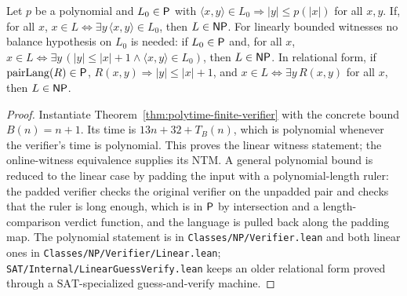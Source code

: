 \begin{lemma}
  \label{lem:polytime-guess-verify}
  \leanok
  Let $p$ be a polynomial and $L_0 \in \mathsf{P}$ with
  $\langle x, y \rangle \in L_0 \Rightarrow |y| \le p(|x|)$ for all $x, y$.
  If, for all $x$, $x \in L \iff \exists y\, \langle x, y \rangle \in L_0$,
  then $L \in \mathsf{NP}$. For linearly bounded witnesses no balance hypothesis
  on $L_0$ is needed: if $L_0 \in \mathsf{P}$ and, for all $x$,
  $x \in L \iff \exists y\, (|y| \le |x| + 1 \wedge \langle x, y \rangle \in
  L_0)$, then $L \in \mathsf{NP}$. In relational form, if
  $\mathrm{pairLang}(R) \in \mathsf{P}$, $R(x, y) \Rightarrow |y| \le |x| + 1$,
  and $x \in L \iff \exists y\, R(x, y)$ for all $x$, then $L \in \mathsf{NP}$.
\end{lemma}
\begin{proof}
  \leanok
  Instantiate Theorem~\ref{thm:polytime-finite-verifier} with the concrete
  bound $B(n)=n+1$. Its time is $13n+32+T_B(n)$, which is polynomial whenever
  the verifier's time is polynomial. This proves the linear witness statement;
  the online-witness equivalence supplies its NTM. A general polynomial bound
  is reduced to the linear case
  by padding the input with a polynomial-length ruler: the padded verifier
  checks the original verifier on the unpadded pair and checks that the ruler
  is long enough, which is in $\mathsf{P}$ by intersection and a length-comparison
  verdict function, and the language is pulled back along the padding map.
  The polynomial statement is in \texttt{Classes/NP/Verifier.lean} and both
  linear ones in \texttt{Classes/NP/Verifier/Linear.lean};
  \texttt{SAT/Internal/LinearGuessVerify.lean} keeps an older relational form
  proved through a $\mathrm{SAT}$-specialized guess-and-verify machine.
\end{proof}

